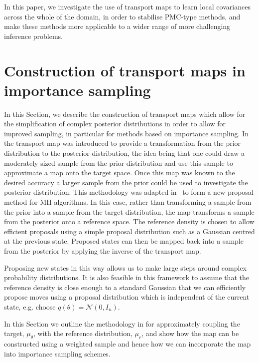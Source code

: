 \documentclass[final]{siamltex}
\begin{document}
In this paper, we investigate the use of transport maps to learn local
covariances across the whole of the domain, in order to stabilise
PMC-type methods, and make these methods more applicable to a wider
range of more challenging inference problems.

\section{Construction of transport maps in importance sampling} \label{sec:map}
In this Section, we describe the construction of transport maps which
allow for the simplification of complex posterior distributions in
order to allow for improved sampling, in particular for methods based
on importance sampling.
In~\cite{el2012bayesian} the transport map was introduced to provide a transformation from the prior
distribution to the posterior distribution, the idea being that one could draw a moderately sized
sample from the prior distribution and use this sample to approximate a map onto the target space.
Once this map was known to the desired accuracy a larger sample from the prior could be used to
investigate the posterior distribution. This
methodology was adapted in~\cite{parno2014transport} to form a new proposal method for MH
algorithms. In this case, rather than transforming a sample from the prior into a sample from the target
distribution, the map transforms a sample from the posterior onto a reference space.
The reference density is chosen to allow efficient proposals using a simple proposal
distribution such as a Gaussian centred at the previous state. Proposed states can then be mapped back into a sample from the posterior by applying the inverse of the transport map.

Proposing new states in this way allows us to make large steps around complex probability distributions.
It is also feasible in this framework to assume that the reference density is close enough to a standard Gaussian that we can efficiently propose moves using a proposal distribution which is independent of the current state, e.g. choose $q(\theta) = \mathcal{N}(0,I_n)$.

In this Section we outline the methodology in
\cite{parno2014transport} for approximately coupling the target,
$\mu_{\theta}$, with the reference distribution, $\mu_r$, and
show how the map can be constructed using a weighted sample
and hence how we can incorporate the map into importance sampling schemes.
\end{document}

